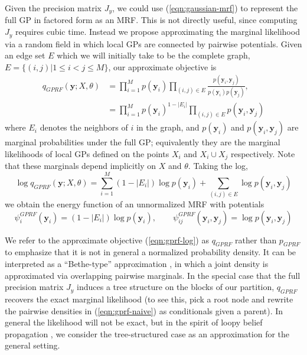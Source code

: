 \documentclass{article}
\renewcommand{\v}[1]{\mathbf{#1}}
\begin{document}
Given the precision matrix $J_y$, we could use (\ref{eqn:gaussian-mrf})
to represent the full GP in factored form as an MRF. This is not
directly useful, since computing $J_y$ requires cubic time. Instead we
propose approximating the marginal likelihood via a random field in
which local GPs are connected by pairwise potentials. Given an edge
set $E$ which we will initially take to be the complete graph, $E
=\{(i,j) | 1\le i < j \le M\}$, our approximate objective is
\begin{align}
q_{GPRF}(\v{y}; X, \theta)&= \prod_{i=1}^M p(\v{y}_i) 
\prod_{(i,j)\in E} \frac{p(\v{y}_i, \v{y}_j)}{p(\v{y}_i) p(\v{y}_j)},\label{eqn:gprf-naive}\\
&= \prod_{i=1}^M p(\v{y}_i)^{1-|E_i|} \prod_{(i,j)\in E} p(\v{y}_i, \v{y}_j) \label{eqn:gprf}
\end{align}
where $E_i$ denotes the neighbors of $i$ in the graph, and $p(\v{y}_i)$ and $p(\v{y}_{i},
\v{y}_j)$ are marginal probabilities under the full GP;
equivalently they are the marginal likelihoods of local GPs
defined on the points $X_i$ and $X_i \cup X_j$ respectively. Note that
these marginals depend implicitly on $X$ and $\theta$. Taking the log,
\begin{equation}
\log q_{GPRF}(\v{y}; X, \theta) = \sum_{i=1}^M (1-|E_i|)\log p(\v{y}_i)
 + \sum_{(i,j)\in E} \log p(\v{y}_i, \v{y}_j)  \label{eqn:gprf-log}
\end{equation}
we obtain the energy function of an unnormalized MRF with potentials
\begin{equation}
\psi_i^{GPRF}(\v{y}_i) = (1-|E_i|)\log p(\v{y}_i), \qquad \psi_{ij}^{GPRF}(\v{y}_i, \v{y}_j) =
\log p(\v{y}_i, \v{y}_j)\end{equation}

We refer to the approximate objective (\ref{eqn:gprf-log}) as $q_{GPRF}$ rather than $p_{GPRF}$
to emphasize that it is not in general a normalized probability
density. It can be interpreted as a ``Bethe-type'' approximation
\cite{bethe}, in which a joint density is approximated via overlapping pairwise marginals. In the special
case that the full precision matrix $J_y$ induces a tree structure on
the blocks of our partition, $q_{GPRF}$ recovers the exact marginal likelihood (to
see this, pick a root node and rewrite the pairwise densities in
(\ref{eqn:gprf-naive}) as
conditionals given a parent). In general the likelihood will not be
exact, but in the spirit of loopy belief propagation \cite{}, we 
consider the tree-structured case as an approximation for the general setting.
\end{document}

